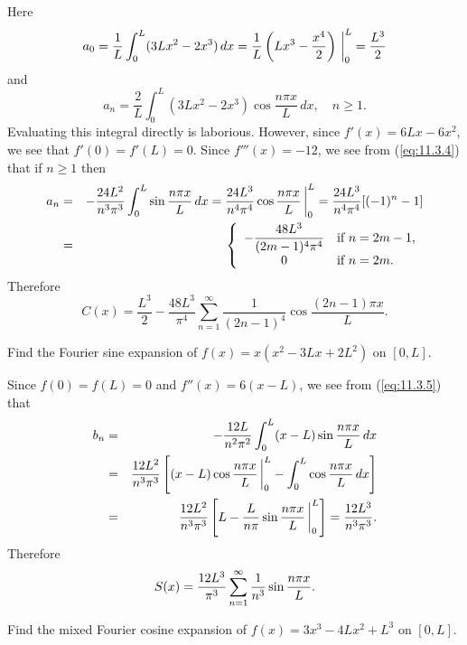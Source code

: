 \begin{examplesolution}
\solution Here
\[
  a_{0}=\frac{1}{L}\int_{0}^{L}(3Lx^{2}-2x^{3})\,dx=\frac{1}{L}\left(Lx^{3}-\frac{x^{4}}{2}\right)\,\bigg|_{0}^{L}=\frac{L^{3}}{2}
\]
and
\[
  a_{n}=\frac{2}{L}\int_{0}^{L}(3Lx^{2}-2x^{3})\cos\frac{n\pi x}{L}\,dx,\quad n\ge1.
\]
Evaluating this integral directly is laborious. However, since $f'(x)=6Lx-6x^{2}$, we see that
$f'(0)=f'(L)=0$. Since $f'''(x)=-12$, we see from (\ref{eq:11.3.4}) that if $n\ge1$ then
\begin{eqnarray*}
  a_{n}&=&-\frac{24L^{2}}{n^{3}\pi^{3}}\int_{0}^{L}\sin\frac{n\pi x}{L}\,dx =\frac{24L^{3}}{n^{4}\pi^{4}}\cos\frac{n\pi x}{L}\,\bigg|_{0}^{L}=\frac{24L^{3}}{n^{4}\pi^{4}}[(-1)^{n}-1]\\ &=& \left\{
  \begin{array}{cl}
    \displaystyle-\frac{48L^{3}}{(2m-1)^{4}\pi^{4}} & \mbox{if $n=2m-1$}, \\
    0                                      & \mbox{if $n=2m$.}
  \end{array}\right.
\end{eqnarray*}
Therefore
\[
  C(x)=\frac{L^{3}}{2}-\frac{48L^{3}}{\pi^{4}}\sum_{n=1}^{\infty}\frac{1}{(2n-1)^{4}}\cos\frac{(2n-1)\pi x}{L}.
\]
\end{examplesolution}

\begin{example}
  \label{example:11.3.6} \rm Find the Fourier sine expansion of $f(x)=x(x^{2}-3Lx+2L^{2})$ on
  $[0,L]$.
\end{example}

\begin{examplesolution}
\solution Since $f(0)=f(L)=0$ and $f''(x)=6(x-L)$, we see from (\ref{eq:11.3.5}) that
\begin{eqnarray*}
  b_{n} & = & -\frac{12L}{n^{2}\pi^{2}}\int_{0}^{L}(x-L)\sin\frac{n\pi x}{L}\,dx                                             \\
        & = & \frac{12L^{2}}{n^{3}\pi^{3}}\left[(x-L)\cos\frac{n\pi x}{L}\,\bigg|_{0}^{L}-\int_{0}^{L}\cos\frac{n\pi x}{L}\,dx\right] \\
        & = & \frac{12L^{2}}{n^{3}\pi^{3}}\left[L-\frac{L}{n\pi}\sin\frac{n\pi x}{L}\,\bigg|_{0}^{L}\right]=\frac{12L^{3}}{n^{3}\pi^{3}}.
\end{eqnarray*}
Therefore
\[
  S(x)=\displaystyle\frac{12L^{3}}{\pi^{3}}\sum_{n=1}^{\infty}\frac{1}{n^{3}}\sin\frac{n\pi x}{L}.
\]
\end{examplesolution}

\begin{example}
  \label{example:11.3.7} \rm Find the mixed Fourier cosine expansion of $f(x)=3x^{3}-4Lx^{2}+L^{3}$
  on $[0,L]$.
\end{example}


